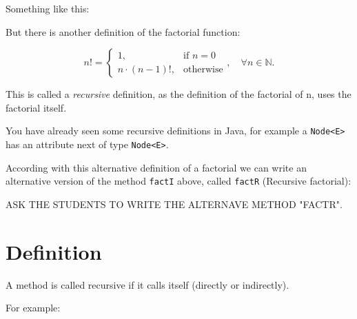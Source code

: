 \documentclass[a4paper, 9pt]{extarticle}
\begin{document}
Something like this:



But there is another definition of the factorial function:

\begin{equation*}
  n! =
  \begin{cases}
    1,              & \text{if } n = 0\\
    n\cdot(n-1)!,   & \text{otherwise}
  \end{cases}, \quad \forall n \in \mathbb{N}.
\end{equation*}

This is called a \emph{recursive} definition, as the definition of the factorial of n, uses the factorial itself.

You have already seen some recursive definitions in Java, for example a \verb+Node<E>+ has an attribute next of type \verb+Node<E>+.

According with this alternative definition of a factorial we can write an
alternative version of the method \verb+factI+ above, called \verb+factR+
(Recursive factorial):

ASK THE STUDENTS TO WRITE THE ALTERNAVE METHOD "FACTR".









\section{Definition}

A method is called recursive if it calls itself (directly or indirectly).

For example:
\end{document}
